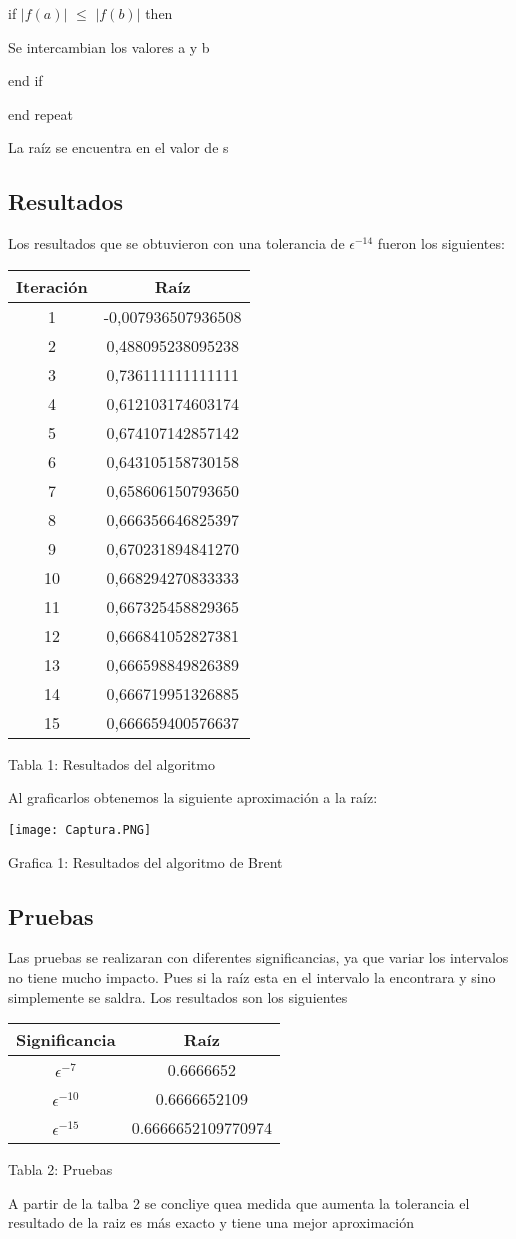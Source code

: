 \documentclass{article}
\begin{document}
  if $|f(a)|$ $\leq$ $ |f(b)|$ then
  
    Se intercambian los valores a y b
    
  end if
  
end repeat

La raíz se encuentra en el valor de s


\subsection{Resultados}
Los resultados que se obtuvieron con una tolerancia de $\epsilon^{-14}$ fueron los siguientes: 

\begin{tabular}{| c | c |}
\hline
Iteración & Raíz \\ \hline
1 & -0,007936507936508 \\
2 & 0,488095238095238 \\
3 & 0,736111111111111 \\
4 & 0,612103174603174 \\
5 & 0,674107142857142 \\
6 & 0,643105158730158 \\
7 & 0,658606150793650 \\
8 & 0,666356646825397 \\
9 & 0,670231894841270 \\
10 & 0,668294270833333 \\
11 & 0,667325458829365 \\
12 & 0,666841052827381 \\
13 & 0,666598849826389 \\
14 & 0,666719951326885 \\
15 & 0,666659400576637 \\ \hline
\end{tabular}

Tabla 1: Resultados del algoritmo 

Al graficarlos obtenemos la siguiente aproximación a la raíz:

\graphicspath{ {Descargas/} }
\texttt{[image: Captura.PNG]}

Grafica 1: Resultados del algoritmo de Brent 
\subsection{Pruebas}
Las pruebas se realizaran con diferentes significancias, ya que variar los intervalos no tiene mucho impacto. Pues si la raíz esta en el intervalo la encontrara y sino simplemente se saldra. Los resultados son los siguientes 

\begin{tabular}{| c | c |}
\hline
Significancia & Raíz \\ \hline
$\epsilon^{-7}$ &   0.6666652  \\
$\epsilon^{-10}$ &  0.6666652109 \\
$\epsilon^{-15}$ & 0.6666652109770974 \\ \hline
\end{tabular}

Tabla 2: Pruebas 

A partir de la talba 2 se concliye quea medida que aumenta la tolerancia el resultado de la raiz es más exacto y tiene una mejor aproximación 
\end{document}
